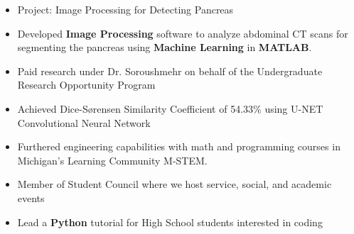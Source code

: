 \documentclass[10pt,a4paper,ragged2e]{altacv}
\begin{document}
\divider

\begin{itemize}
\item Project: Image Processing for Detecting Pancreas 
\smallskip
\item Developed \textbf{Image Processing} software to analyze abdominal CT scans for segmenting the pancreas using \textbf{Machine Learning} in \textbf{MATLAB}.
\smallskip
\item Paid research under Dr. Soroushmehr on behalf of the Undergraduate Research Opportunity Program
\smallskip
\item Achieved Dice-Sørensen Similarity Coefficient of 54.33\% using U-NET Convolutional Neural Network
\end{itemize}

\divider

\begin{itemize}
\item Furthered engineering capabilities with math and programming courses in Michigan's Learning Community M-STEM.
\smallskip
\item Member of Student Council where we host service, social, and academic events
\smallskip
\item Lead a \textbf{Python} tutorial for High School students interested in coding
\end{itemize}

\clearpage

\nocite{*}
\end{document}
